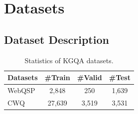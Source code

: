 



\section{ Datasets}\label{sec:dataset}

\subsection{Dataset Description}
\begin{table}[h]
\centering
\label{tab:dataset_statistics}
\begin{tabular}{lccc}
\toprule
\textbf{Datasets} & \textbf{\#Train} & \textbf{\#Valid} & \textbf{\#Test} \\
\midrule
WebQSP     & 2,848   & 250    & 1,639  \\
\midrule
CWQ        & 27,639  & 3,519  & 3,531   \\
\bottomrule
\end{tabular}
\caption{Statistics of KGQA datasets.}
\label{tab:datasets}
\end{table}


